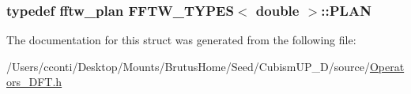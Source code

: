 \subsubsection[{P\+L\+A\+N}]{\setlength{\rightskip}{0pt plus 5cm}typedef fftw\+\_\+plan {\bf F\+F\+T\+W\+\_\+\+T\+Y\+P\+E\+S}$<$ double $>$\+::{\bf P\+L\+A\+N}}\label{struct_f_f_t_w___t_y_p_e_s_3_01double_01_4_a19c1538d166a5a9f01680c00253850ac}


The documentation for this struct was generated from the following file\+:\begin{DoxyCompactItemize}
\item 
/\+Users/cconti/\+Desktop/\+Mounts/\+Brutus\+Home/\+Seed/\+Cubism\+U\+P\+\_\+D/source/\hyperlink{_operators___d_f_t_8h}{Operators\+\_\+\+D\+F\+T.\+h}\end{DoxyCompactItemize}
